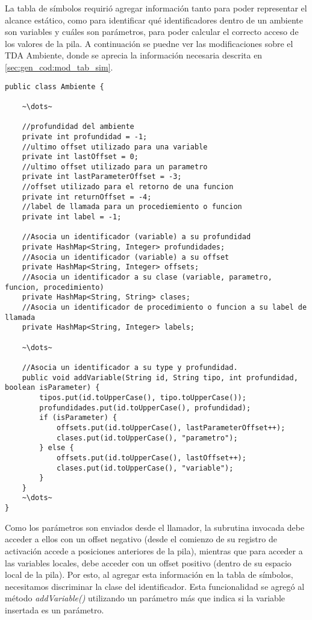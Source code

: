 La tabla de símbolos requirió agregar información tanto para poder representar el alcance estático, como para identificar qué identificadores dentro de un ambiente son variables y cuáles son parámetros, para poder calcular el correcto acceso de los valores de la pila. A continuación se puedne ver las modificaciones sobre el TDA Ambiente, donde se aprecia la información necesaria descrita en \ref{sec:gen_cod:mod_tab_sim}.

\begin{verbatim}
public class Ambiente {
    
    ~\dots~
    
    //profundidad del ambiente
    private int profundidad = -1;
    //ultimo offset utilizado para una variable
    private int lastOffset = 0;
    //ultimo offset utilizado para un parametro
    private int lastParameterOffset = -3;
    //offset utilizado para el retorno de una funcion
    private int returnOffset = -4;
    //label de llamada para un procediemiento o funcion
    private int label = -1;
    
    //Asocia un identificador (variable) a su profundidad
    private HashMap<String, Integer> profundidades;
    //Asocia un identificador (variable) a su offset
    private HashMap<String, Integer> offsets;
    //Asocia un identificador a su clase (variable, parametro, funcion, procedimiento)
    private HashMap<String, String> clases;
    //Asocia un identificador de procedimiento o funcion a su label de llamada
    private HashMap<String, Integer> labels;
    
    ~\dots~
    
    //Asocia un identificador a su type y profundidad.
    public void addVariable(String id, String tipo, int profundidad, boolean isParameter) {
        tipos.put(id.toUpperCase(), tipo.toUpperCase());
        profundidades.put(id.toUpperCase(), profundidad);
        if (isParameter) {
            offsets.put(id.toUpperCase(), lastParameterOffset++);
            clases.put(id.toUpperCase(), "parametro");
        } else {
            offsets.put(id.toUpperCase(), lastOffset++);
            clases.put(id.toUpperCase(), "variable");
        }
    }
    ~\dots~
}
\end{verbatim}

Como los parámetros son enviados desde el llamador, la subrutina invocada debe acceder a ellos con un offset negativo (desde el comienzo de su registro de activación accede a posiciones anteriores de la pila), mientras que para acceder a las variables locales, debe acceder con un offset positivo (dentro de su espacio local de la pila). Por esto, al agregar esta información en la tabla de símbolos, necesitamos discriminar la clase del identificador. Esta funcionalidad se agregó al método \emph{addVariable()} utilizando un parámetro más que indica si la variable insertada es un parámetro.

